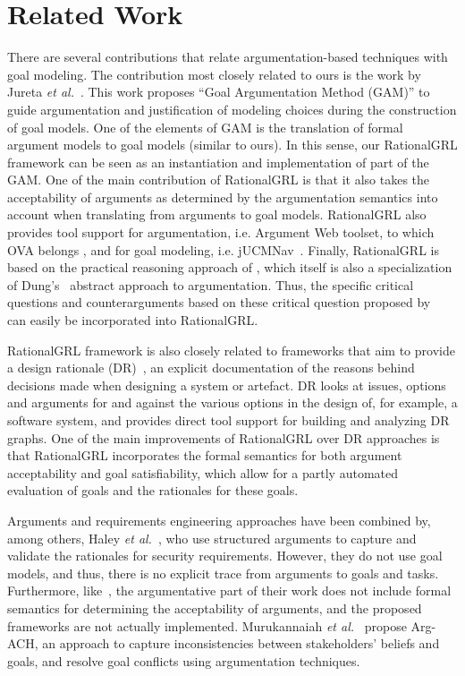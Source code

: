 \section{Related Work}
\label{sect:relatedwork}

There are several contributions that relate argumentation-based techniques with goal modeling. The contribution most closely related to ours is the work by Jureta \emph{et al.}~\cite{Jureta:RE2008}. This work proposes ``Goal Argumentation Method (GAM)'' to guide argumentation and justification of modeling choices during the construction of goal models. One of the elements of GAM is the translation of formal argument models to goal models (similar to ours). In this sense, our \textsf{RationalGRL} framework can be seen as an instantiation and implementation of  part of the GAM. One of the main contribution of \textsf{RationalGRL} is that it also takes the acceptability of arguments as determined by the argumentation semantics \cite{Dung1995} into account when translating from arguments to goal models.  \textsf{RationalGRL} also provides tool support for argumentation, i.e. Argument Web toolset, to which OVA belongs \cite{bex2013implementing}, and for goal modeling, i.e. jUCMNav~\cite{jUCMNav}. Finally, \textsf{RationalGRL} is based on the practical reasoning approach of \cite{Atkinson2014}, which itself is also a specialization of Dung's~\cite{Dung1995} abstract approach to argumentation. Thus, the specific critical questions and counterarguments based on these critical question proposed by~\cite{Atkinson2014} can easily be incorporated into \textsf{RationalGRL}. 

\textsf{RationalGRL} framework is also closely related to frameworks that aim to provide a design rationale (DR)~\cite{shum2006hypermedia}, an explicit documentation of the reasons behind decisions made when designing a system or artefact. DR looks at issues, options and arguments for and against the various options in the design of, for example, a software system, and provides direct tool support for building and analyzing DR graphs. One of the main improvements of \textsf{RationalGRL} over DR approaches is that \textsf{RationalGRL} incorporates the formal semantics for both argument acceptability and goal satisfiability, which allow for a partly automated evaluation of goals and the rationales for these goals. 

Arguments and requirements engineering approaches have been combined by, among others, Haley \emph{et al.}~\cite{haley2005arguing}, who use structured arguments to capture and validate the rationales for security requirements. However, they do not use goal models, and thus, there is no explicit trace from arguments to goals and tasks. Furthermore, like~\cite{Jureta:RE2008}, the argumentative part of their work does not include formal semantics for determining the acceptability of arguments, and the proposed frameworks are not actually implemented. Murukannaiah \emph{et al.}~\cite{murukannaiah2015resolving} propose Arg-ACH, an approach to capture inconsistencies between stakeholders' beliefs and goals, and resolve goal conflicts using argumentation techniques.

